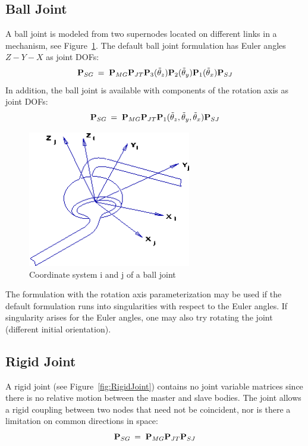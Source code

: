 \subsection{Ball Joint}

A ball joint is modeled from two supernodes located on different
links in a mechanism, see Figure~\ref{fig:BallJoint}.
The default ball joint formulation has Euler angles $Z-Y-X$ as joint DOFs:
%
\begin{equation}
{\bf P}_{SG} \:=\; {\bf P}_{MG}{\bf P}_{JT}
{\bf P}_3(\tilde\theta_z)
{\bf P}_2(\tilde\theta_y)
{\bf P}_1(\tilde\theta_x)
{\bf P}_{SJ}
\label{eq:BallJoint1}
\end{equation}
%
In addition, the ball joint is available with components of the rotation
axis as joint DOFs:
%
\begin{equation}
{\bf P}_{SG} \:=\; {\bf P}_{MG}{\bf P}_{JT}
{\bf P}_1(\tilde\theta_z,\tilde\theta_y,\tilde\theta_x)
{\bf P}_{SJ}
\label{eq:BallJoint2}
\end{equation}

\begin{figure}[b]
\center\includegraphics[width=2.8in]{Figures/ballJoint.png}
\caption{Coordinate system i and j of a ball joint}
\label{fig:BallJoint}
\end{figure}

The formulation with the rotation axis parameterization may be used if the
default formulation runs into singularities with respect to the Euler angles.
If singularity arises for the Euler angles, one may also try rotating the joint
(different initial orientation).


\subsection{Rigid Joint}

A rigid joint (see Figure~\ref{fig:RigidJoint}) contains no joint variable
matrices since there is no relative motion between the master and slave bodies.
The joint allows a rigid coupling between two nodes that need not be coincident,
nor is there a limitation on common directions in space:
%
\begin{equation}
{\bf P}_{SG} \:=\; {\bf P}_{MG}{\bf P}_{JT}{\bf P}_{SJ}
\label{eq:RigidJointDef}
\end{equation}

